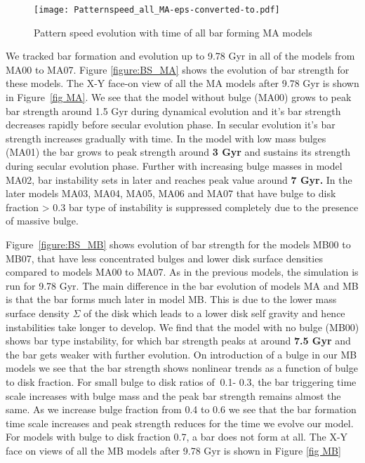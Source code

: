 \documentclass[a4paper,fleqn,usenatbib,useAMS]{mnras}
\begin{document}
\begin{figure}
\texttt{[image: Patternspeed\_all\_MA-eps-converted-to.pdf]}
\caption{Pattern speed evolution with time  of all bar forming MA models }\label{PS_MA}
\end{figure}

We tracked bar formation and evolution up to 9.78 Gyr in all of the models from MA00 to MA07. Figure \ref{figure:BS_MA} shows the evolution of bar strength for these models. The X-Y face-on view of all the MA models after 9.78 Gyr is shown in Figure~\ref{fig MA}. We see that the model without bulge (MA00) grows to peak bar strength  around 1.5 Gyr during dynamical evolution and it's bar strength decreases rapidly before secular evolution phase. In secular evolution it's bar strength increases gradually with time. In the model with low mass bulges (MA01) the bar grows to peak strength around \textbf{3 Gyr} and sustains its strength during secular evolution phase. Further with increasing bulge masses in model MA02, bar instability sets in later and reaches peak value around \textbf{7 Gyr.} In the later models MA03, MA04, MA05, MA06 and MA07 that have bulge to disk  fraction > 0.3 bar type of instability is suppressed completely due to the presence of massive bulge. 

Figure~\ref{figure:BS_MB} shows evolution of bar strength for the models MB00 to MB07, that have less concentrated bulges and lower disk surface densities compared to models MA00 to MA07. As in the previous models, the simulation is run for 9.78 Gyr. The main difference in the bar evolution of models MA and MB is that the bar forms much later in model MB. This is due to the lower mass surface density $\Sigma$ of the disk which leads to a lower disk self gravity and hence instabilities take longer to develop. We find that the model with no bulge (MB00) shows bar type instability, for which bar strength peaks at around \textbf{7.5 Gyr} and the bar gets weaker with further evolution. On introduction of a bulge in our MB models we see that the bar strength shows nonlinear trends as a function of bulge to disk fraction. For small bulge to disk ratios of $~ $0.1- 0.3, the bar triggering time scale increases with bulge mass and the peak bar strength remains almost the same. As we increase bulge fraction from 0.4 to 0.6 we see that the bar formation time scale increases and peak strength reduces for the time we evolve our model. For models with bulge to disk fraction 0.7, a bar does not  form at all. The X-Y face on views of all the MB models after 9.78 Gyr is shown in Figure \ref{fig MB} 
\end{document}
